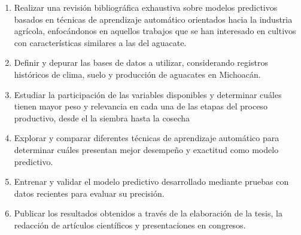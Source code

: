 \begin{enumerate}
    \item Realizar una revisión bibliográfica exhaustiva sobre modelos predictivos basados en técnicas de aprendizaje automático orientados hacia la industria agrícola, enfocándonos en aquellos trabajos que se han interesado en cultivos con características similares a las del aguacate.
    \item Definir y depurar las bases de datos a utilizar, considerando registros históricos de clima, suelo y producción de aguacates en Michoacán.
    \item Estudiar la participación de las variables disponibles y determinar cuáles tienen mayor peso y relevancia en cada una de las etapas del proceso productivo, desde el la siembra hasta la cosecha
    \item Explorar y comparar diferentes técnicas de aprendizaje automático para determinar cuáles presentan mejor desempeño y exactitud como modelo predictivo.
    \item Entrenar y validar el modelo predictivo desarrollado mediante pruebas con datos recientes para evaluar su precisión.
    \item Publicar los resultados obtenidos a través de la elaboración de la tesis, la redacción de artículos científicos y presentaciones en congresos.
\end{enumerate}